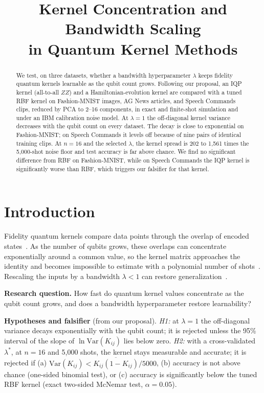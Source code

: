 \documentclass[conference]{IEEEtran}
\begin{document}
\title{Kernel Concentration and Bandwidth Scaling\\in Quantum Kernel Methods}

\author{}

\maketitle

\begin{abstract}
We test, on three datasets, whether a bandwidth hyperparameter $\lambda$ keeps fidelity quantum kernels learnable as the qubit count grows. Following our proposal, an IQP kernel (all-to-all $ZZ$) and a Hamiltonian-evolution kernel are compared with a tuned RBF kernel on Fashion-MNIST images, AG News articles, and Speech Commands clips, reduced by PCA to 2--16 components, in exact and finite-shot simulation and under an IBM calibration noise model. At $\lambda=1$ the off-diagonal kernel variance decreases with the qubit count on every dataset. The decay is close to exponential on Fashion-MNIST; on Speech Commands it levels off because of nine pairs of identical training clips. At $n=16$ and the selected $\lambda$, the kernel spread is 202 to 1{,}561 times the 5{,}000-shot noise floor and test accuracy is far above chance. We find no significant difference from RBF on Fashion-MNIST, while on Speech Commands the IQP kernel is significantly worse than RBF, which triggers our falsifier for that kernel.
\end{abstract}

\section{Introduction}
Fidelity quantum kernels compare data points through the overlap of encoded states~\cite{havlicek2019supervised}. As the number of qubits grows, these overlaps can concentrate exponentially around a common value, so the kernel matrix approaches the identity and becomes impossible to estimate with a polynomial number of shots~\cite{thanasilp2024concentration,huang2021power}. Rescaling the inputs by a bandwidth $\lambda<1$ can restore generalization~\cite{shaydulin2022bandwidth}.

\textbf{Research question.} How fast do quantum kernel values concentrate as the qubit count grows, and does a bandwidth hyperparameter restore learnability?

\textbf{Hypotheses and falsifier} (from our proposal). \emph{H1:} at $\lambda=1$ the off-diagonal variance decays exponentially with the qubit count; it is rejected unless the 95\% interval of the slope of $\ln\mathrm{Var}(K_{ij})$ lies below zero. \emph{H2:} with a cross-validated $\lambda^{*}$, at $n=16$ and 5{,}000 shots, the kernel stays measurable and accurate; it is rejected if (a) $\mathrm{Var}(K_{ij})<\overline{K_{ij}(1-K_{ij})}/5000$, (b) accuracy is not above chance (one-sided binomial test), or (c) accuracy is significantly below the tuned RBF kernel (exact two-sided McNemar test, $\alpha=0.05$).
\end{document}
